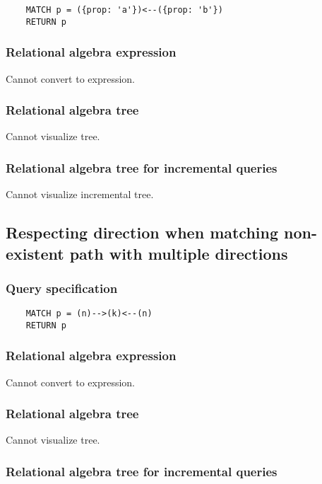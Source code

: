 	\begin{lstlisting}
	MATCH p = ({prop: 'a'})<--({prop: 'b'})
	RETURN p
	\end{lstlisting}


	\subsubsection*{Relational algebra expression}

	Cannot convert to expression.

	\subsubsection*{Relational algebra tree}

	Cannot visualize tree.

	\subsubsection*{Relational algebra tree for incremental queries}

	Cannot visualize incremental tree.
	\subsection{Respecting direction when matching non-existent path with multiple directions}

	\subsubsection*{Query specification}

	\begin{lstlisting}
	MATCH p = (n)-->(k)<--(n)
	RETURN p
	\end{lstlisting}


	\subsubsection*{Relational algebra expression}

	Cannot convert to expression.

	\subsubsection*{Relational algebra tree}

	Cannot visualize tree.

	\subsubsection*{Relational algebra tree for incremental queries}

